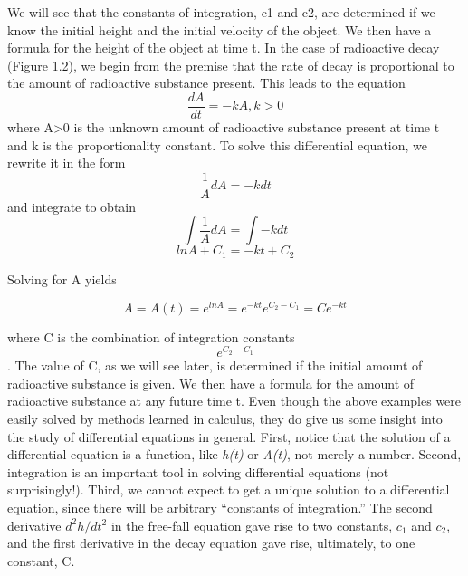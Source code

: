 \documentclass{article}
\begin{document}
We will see that the constants of integration, c1 and c2, are determined if we know the initial height and the initial velocity of the object. We then have a formula for the height of the object at time t.
In the case of radioactive decay (Figure 1.2), we begin from the premise that the rate of decay is proportional to the amount of radioactive substance present. This leads to the equation
\begin{equation}
    \frac{dA}{dt} = -kA, k>0
\end{equation}
where A>0 is the unknown amount of radioactive substance present at time t and k is the proportionality constant. To solve this differential equation, we rewrite it in the form
\begin{equation}
    \frac{1}{A}dA = -k dt
\end{equation}
and integrate to obtain
\begin{equation}
\int\frac{1}{A}dA = \int -k dt
\end{equation}
\begin{equation}
ln A + C_1 = -kt +C_2
\end{equation}

Solving for A yields

\begin{equation}
    A = A(t) = e^{lnA} = e^{-kt}e^{C_2-C_1} = Ce^{-kt}
\end{equation}

where C is the combination of integration constants \begin{equation*}
e^{C_2-C_1} \end{equation*}. The value of C, as we will see later, is determined if the initial amount of radioactive substance is given. We then have a formula for the amount of radioactive substance at any future time t.
Even though the above examples were easily solved by methods learned in calculus, they do give us some insight into the study of differential equations in general. First, notice that the solution of a differential equation is a function, like \textsl{h(t)} or \textsl{A(t)}, not merely a number. Second, integration is an important tool in solving differential equations (not surprisingly!). Third, we cannot expect to get a unique solution to a differential equation, since there will be arbitrary “constants of integration.” The second derivative \begin{math}  d^2h/dt^2 \end{math}  in the free-fall equation gave rise to two constants, \begin{math} c_1 \end{math} and \begin{math} c_2 \end{math}, and the first derivative in the decay equation gave rise, ultimately, to one constant, C.
\end{document}
